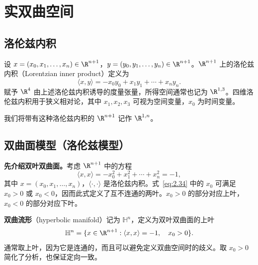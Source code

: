 \section{实双曲空间}
\subsection{洛伦兹内积}
设 $x=(x_0,x_1,\ldots,x_n)\in\R^{n+1}$，$y=(y_0,y_1,\ldots,y_n)\in\R^{n+1}$。$\R^{n+1}$ 上的洛伦兹内积（Lorentzian inner product）定义为
\begin{equation*}
  \langle x,y\rangle=-x_0y_0+x_1y_1+\cdots+x_ny_n.
  \tag{2.33}\label{eq:2.33}
\end{equation*}
赋予 $\R^4$ 由上述洛伦兹内积诱导的度量张量，所得空间通常也记为 $\R^{1,3}$。四维洛伦兹内积用于狭义相对论，其中 $x_1,x_2,x_3$ 可视为空间变量，$x_0$ 为时间变量。

我们将带有这种洛伦兹内积的 $\R^{n+1}$ 记作 $\R^{1,n}$。

\subsection{双曲面模型（洛伦兹模型）}
\textbf{先介绍双叶双曲面。}考虑 $\R^{n+1}$ 中的方程
\begin{equation*}
  \langle x,x\rangle=-x_0^2+x_1^2+\cdots+x_n^2=-1,
  \tag{2.34}\label{eq:2.34}
\end{equation*}
其中 $x=(x_0,x_1,\ldots,x_n)$，$\langle\cdot,\cdot\rangle$ 是洛伦兹内积。式~\eqref{eq:2.34} 中的 $x_0$ 可满足 $x_0>0$ 或 $x_0<0$，因而此式定义了互不连通的两叶。$x_0>0$ 的部分对应上叶，$x_0<0$ 的部分对应下叶。

\textbf{双曲流形}（hyperbolic manifold）记为 $\mathbb H^n$，定义为双叶双曲面的上叶
\[
  \mathbb H^n=\{x\in\R^{n+1}:\langle x,x\rangle=-1,\quad x_0>0\}.
\]
通常取上叶，因为它是连通的，而且可以避免定义双曲空间时的歧义。取 $x_0>0$ 简化了分析，也保证定向一致。

